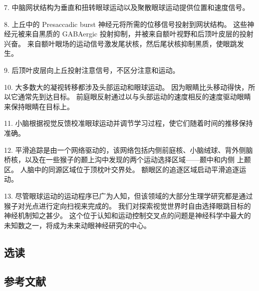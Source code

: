 7. 中脑网状结构为垂直和扭转眼球运动以及聚散眼球运动提供位置和速度信号。

8. 上丘中的 Presaccadic burst 神经元将所需的位移信号投射到网状结构。 这些神经元被来自黑质的 GABAergic 投射抑制，并被来自额叶视野和后顶叶皮层的投射兴奋。 来自额叶眼场的运动信号激发尾状核，然后尾状核抑制黑质，使眼跳发生。

9. 后顶叶皮层向上丘投射注意信号，不区分注意和运动。

10. 大多数大的凝视转移都涉及头部运动和眼球运动。 因为眼睛比头移动得快，所以它通常先到达目标。 前庭眼反射通过以与头部运动的速度相反的速度驱动眼睛来保持眼睛在目标上。

11. 小脑根据视觉反馈校准眼球运动并调节学习过程，使它们随着时间的推移保持准确。

12. 平滑追踪是由一个网络驱动的，该网络包括内侧前庭核、小脑绒球、背外侧脑桥核，以及在一些猴子的颞上沟中发现的两个运动选择区域——颞中和内侧 上颞区。 人脑中的同源区域位于顶枕叶交界处。 额眼区的追逐区域启动平滑追逐运动。

13. 尽管眼球运动的运动程序已广为人知，但该领域的大部分生理学研究都是通过猴子对光点进行定向扫视来完成的。 我们对探索视觉世界时自由选择眼跳目标的神经机制知之甚少。 这个位于认知和运动控制交叉点的问题是神经科学中最大的未知数之一，将成为未来动眼神经研究的中心。


\subsection{选读}
\subsection{参考文献}


